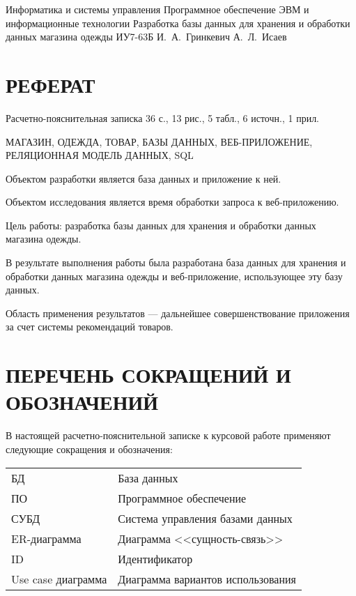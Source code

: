 \documentclass{bmstu}
\begin{document}
\makecourseworktitle
    {Информатика и системы управления}
    {Программное обеспечение ЭВМ и информационные технологии}
    {Разработка базы данных для хранения и обработки данных магазина одежды}
    {ИУ7-63Б}
    {И.~А.~Гринкевич}
    {А.~Л.~Исаев}
    {}
    {}
    
\setcounter{page}{3}

{\centering \chapter*{РЕФЕРАТ}}

Расчетно-пояснительная записка 36 с., 13 рис., 5 табл., 6 источн., 1 прил.

\noindent МАГАЗИН, ОДЕЖДА, ТОВАР, БАЗЫ ДАННЫХ, ВЕБ-ПРИЛОЖЕНИЕ, РЕЛЯЦИОННАЯ МОДЕЛЬ ДАННЫХ, SQL

Объектом разработки является база данных и приложение к ней.

Объектом исследования является время обработки запроса к веб-приложению.

Цель работы: разработка базы данных для хранения и обработки данных магазина одежды.

В результате выполнения работы была разработана база данных для хранения и обработки данных магазина одежды и веб-приложение, использующее эту базу данных.

Область применения результатов --- дальнейшее совершенствование приложения за счет системы рекомендаций товаров.

{\centering \maketableofcontents}

{\centering \chapter*{ПЕРЕЧЕНЬ СОКРАЩЕНИЙ И ОБОЗНАЧЕНИЙ}}

В настоящей расчетно-пояснительной записке к курсовой работе применяют следующие сокращения и обозначения:

\begin{table}[H]
\begin{tabular}{p{5cm}p{10.5cm}}
БД & База данных
\tabularnewline
ПО & Программное обеспечение
\tabularnewline
СУБД & Система управления базами данных
\tabularnewline
ER-диаграмма & Диаграмма <<сущность-связь>>
\tabularnewline
ID & Идентификатор
\tabularnewline
Use case диаграмма & Диаграмма вариантов использования
\tabularnewline
\end{tabular}
\end{table}
\end{document}
